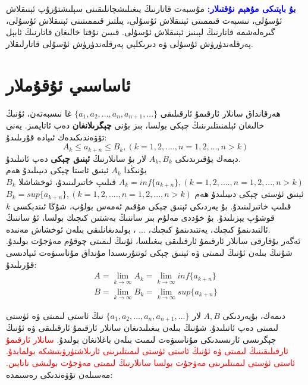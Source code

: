 \textcolor{blue}{\textbf{بۇ باپتىكى مۇھېم نۇقتىلار:}}
مۇسبەت قاتارنىڭ يىغىلىشچانلىقىنى سېلىشتۇرۇپ ئېنىقلاش ئۇسۇلى، نىسبەت قىممىتى ئېنىقلاش ئۇسۇلى، يىلتىز قىممىتىنى ئېنىقلاش ئۇسۇلى، گىرەلەشمە قاتارنىڭ لېبنىز ئېنىقلاش ئۇسۇلى. قىيىن نۇقتا خالىغان قاتارنىڭ ئابېل پەرقلەندۈرۈش ئۇسۇلى ۋە دىرىكلېي پەرقلەندۈرۈش ئۇسۇلى قاتارلىقلار.

\section{ئاساسىي ئۇقۇملار}
ھەرقانداق سانلار ئارقىمۇ ئارقىلىقى 
$\{a_1,a_2,...,a_n,a_{n+1},...\}$
غا نىسبەتەن، ئۇنىڭ خالىغان ئېلمنىتلىرىنىڭ چېكى بولسا، بىز بۇنى \textbf{چېگرىلانغان} دەپ ئاتايمىز. يەنى تۆۋەندىكىدەك ئىپادە قۇرىلىدۇ:
$$
A_k \le a_{k+n} \le B_k, (k=1,2,....,n=1,2,..., n>k)
$$
دېمەك يۇقىرىدىكى $A_k,B_k$ لار بۇ سانلارنىڭ \textbf{ئېنىق چېكى} دەپ ئاتىلىدۇ.\\بۇنىڭدا $A_k$ ئېنىق ئاستا چېكى دىيىلىدۇ ھەم
$A_k = inf \{a_{k+n}\},(k=1,2,....,n=1,2,..., n>k)$
قىلىپ خاتىرلىنىدۇ، ئوخشاشلا $B_k$ ئېنىق ئۈستى چېكى دىيىلىدۇ ھەم
$B_k = sup \{a_{k+n}\},(k=1,2,....,n=1,2,..., n>k)$
قىلىپ خاتىرلىنىدۇ.
بۇ يەردىكى ئېنىق چېكى مۇقىم ئەمەس بولۇپ، شۇڭا ئىندېكسى $k$ قوشۇپ يېزىلىدۇ. بۇ خۇددى مەلۇم بىر ساننىڭ بەشتىن كىچىك بولسا، ئۇ ساننىڭ ئالتىدىنمۇ كىچىك، يەتتىدىنمۇ كىچىك، ... ، بولىدىغانلىقى بىلەن ئوخشاش مەنىدە.\\
ئەگەر يۇقارقى سانلار ئارقىمۇ ئارقىلىقى يىغىلسا، ئۇنىڭ لىمىتى چوقۇم مەۋجۇت بولىدۇ. شۇنىڭ بىلەن ئۇنىڭ لىمىتى ۋە ئېنىق چېكى ئوتتۇرىسىدا  مۇنداق مۇناسىۋەت ئىپادىسى قۇرىلىدۇ:
\begin{align*}
A = \lim_{k \to \infty}A_k = \lim_{k\to\infty} inf \{a_{k+n}\} \\
B = \lim_{k \to \infty}B_k = \lim_{k\to\infty} sup \{a_{k+n}\}
\end{align*}

دىمەك، بۇيەردىكى $A,B$ لار $\{a_1,a_2,...,a_n,a_{n+1},...\}$ نىڭ ئاستى لىمىتى ۋە ئۈستى لىمىتى دەپ ئاتىلىدۇ. شۇنىڭ بىلەن يىغىلىدىغان سانلار ئارقىمۇ ئارقىلىقى ۋە ئۇنىڭ چېگرىسى ئارىسىدىكى مۇناسىۋەت لىمىت بىلەن باغلانغان بولىدۇ.
\textcolor{red}{
سانلار ئارقىمۇ ئارقىلىقىنىڭ لىمىتى ۋە ئۇنىڭ ئاستى ئۈستى لىمىتلىرىنى ئارىلاشتۈرۋېتىشكە بولمايدۇ. ئاستى ئۈستى لىمىتلىرىنى مەۋجۇت بولسا سانلارنىڭ لىمىتى مەۋجۇت بولىشى ناتايىن.} مەسىلەن تۆۋەندىكى رەسىمدە:\\
\begin{figure}[htbp]
\hskip 10pt
\end{figure}

